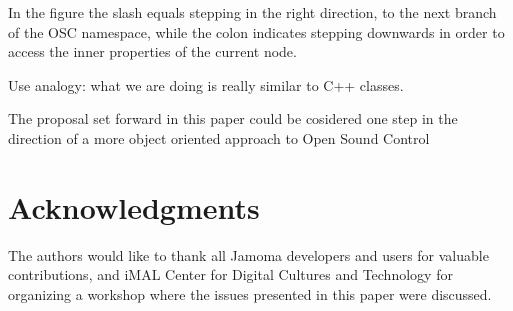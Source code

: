 \documentclass{NIME-alternate}
\begin{document}
In the figure the slash equals stepping in the right direction, to the next branch of the OSC namespace, while the colon indicates stepping downwards in order to access the inner properties of the current node.

Use analogy: what we are doing is really similar to C++ classes.

The proposal set forward in this paper could be cosidered one step in the direction of a more object oriented approach to Open Sound Control









\section{Acknowledgments} %
\label{sec:acknowledgments}

The authors would like to thank all Jamoma developers and users for valuable contributions, and iMAL Center for Digital Cultures and Technology for organizing a workshop where the issues presented in this paper were discussed.





%
\begin{small}

\end{small}
%


\balancecolumns %
\end{document}
